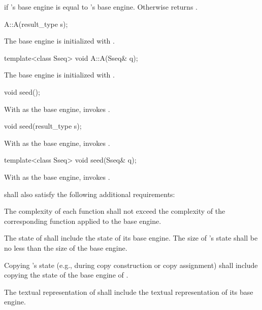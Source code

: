 \begin{itemdescr}
\pnum\returns
  if 's base engine is equal to 's base engine.
 Otherwise returns .
\end{itemdescr}


\begin{itemdecl}
A::A(result_type s);  
\end{itemdecl}

\begin{itemdescr}
\pnum\effects
 The base engine is initialized
 with .
\end{itemdescr}


\begin{itemdecl}
template<class Sseq> void A::A(Sseq& q);  
\end{itemdecl}

\begin{itemdescr}
\pnum\effects
 The base engine is initialized
 with .
\end{itemdescr}

\begin{itemdecl}
void seed();  
\end{itemdecl}

\begin{itemdescr}
\pnum\effects
 With  as the base engine, invokes .
\end{itemdescr}

\begin{itemdecl}
void seed(result_type s);  
\end{itemdecl}

\begin{itemdescr}
\pnum\effects
 With  as the base engine, invokes .
\end{itemdescr}

\begin{itemdecl}
template<class Sseq> void seed(Sseq& q);  
\end{itemdecl}

\begin{itemdescr}
\pnum\effects
 With  as the base engine, invokes .
\end{itemdescr}

\pnum
{} shall also satisfy
the following additional requirements:
\begin{enumeratea}
 \item
   The complexity
   of each function
   shall not exceed the complexity
   of the corresponding function
   applied to the base engine.
 \item
   The state
   of 
   shall include the state
   of its base engine.
   The size of 's state
   shall be no less than the size of the base engine.
 \item
   Copying 's state
   (e.g., during copy construction or copy assignment)
   shall include copying
   the state of the base engine of .
 \item
   The textual representation
   of 
   shall include
   the textual representation of its base engine.
\end{enumeratea}

